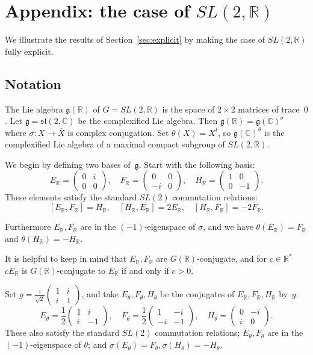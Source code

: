 \documentclass[10pt,leqno]{article}
\numberwithin{equation}{section}
\newcommand{\R}{\mathbb R}
\newcommand{\C}{\mathbb C}
\renewcommand{\sl}{\mathfrak s\mathfrak l}
\newcommand{\g}{\mathfrak g}
\begin{document}
\section{Appendix: the case of $SL(2,\R)$}

We illustrate the results of Section~\ref{sec:explicit} by making the case of $SL(2,\R)$ fully explicit.

\subsection{Notation}

The  Lie algebra $\g(\R)$  of $G=SL(2,\R)$  is the space of $2\times 2$  matrices of trace~$0$.
Let $\g=\sl(2,\C)$ be the complexified Lie algebra.
Then $\g(\R)=\g(\C)^\sigma$ where $\sigma\colon X \to \overline X$ is complex conjugation. 
Set $\theta(X)=X^t$, so $\g(\C)^\theta$  is the complexified Lie algebra of a maximal compact subgroup of $SL(2,\R)$.

We begin by defining two  bases of~$\g$. Start with the following basis:
$$
E_\R=\begin{pmatrix}0&i\\0&0\end{pmatrix},\quad 
F_\R=\begin{pmatrix}0&0\\-i&0\end{pmatrix},\quad
H_\R=\begin{pmatrix}1&0\\0&-1\end{pmatrix}.
$$
These elements satisfy the standard $SL(2)$ commutation relations: 
\[ [E_\R, F_\R] = H_\R, \quad [H_\R, E_\R] = 2E_\R, \quad [H_\R, F_\R] = -2F_\R. \]

Furthermore $E_\R,F_\R$ are in the $(-1)$-eigenspace of $\sigma$, and we have
$\theta(E_\R)=F_\R$ and $\theta(H_\R)=-H_\R$.

It is helpful to keep in mind that $E_\R,F_\R$ are $G(\R)$-conjugate,
and for $c\in \R^*$ $cE_\R$ is $G(\R)$-conjugate to $E_\R$ if and only if $c>0$.

Set $g=\frac 1{\sqrt 2}\begin{pmatrix}1&i\\i&1
\end{pmatrix}$, and take $E_\theta,F_\theta,H_\theta$ be the conjugates of $E_\R,F_\R,H_\R$ by~$g$:
$$
E_\theta=\frac12\begin{pmatrix}1&i\\i&-1\end{pmatrix}, \quad
F_\theta=\frac12\begin{pmatrix}1&-i\\-i&-1\end{pmatrix},\quad
H_\theta=\begin{pmatrix}0&-i\\i&0\end{pmatrix}.
$$
These also satisfy the standard $SL(2)$ commutation relations; $E_\theta,F_\theta$ are in the $(-1)$-eigenspace of $\theta$; 
and  $\sigma(E_\theta)=F_\theta,\sigma(H_\theta)=-H_\theta$.
\end{document}
